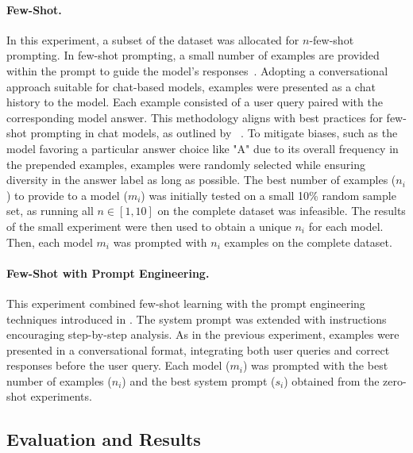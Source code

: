 \paragraph{Few-Shot.}
\label{few-shot-prompt}
In this experiment, a subset of the dataset was allocated for $n$-few-shot prompting. In few-shot prompting, a small number of examples are provided within the prompt to guide the model's responses~\cite{brownLanguageModelsAre2020}. Adopting a conversational approach suitable for chat-based models, examples were presented as a chat history to the model. Each example consisted of a user query paired with the corresponding model answer. This methodology aligns with best practices for few-shot prompting in chat models, as outlined by ~\cite{HowUseFew}. To mitigate biases, such as the model favoring a particular answer choice like "A" due to its overall frequency in the prepended examples, examples were randomly selected while ensuring diversity in the answer label as long as possible. The best number of examples ($n_i$) to provide to a model ($m_i$) was initially tested on a small 10\% random sample set, as running all $n \in [1, 10]$ on the complete dataset was infeasible. The results of the small experiment were then used to obtain a unique $n_i$ for each model. Then, each model $m_i$ was prompted with $n_i$ examples on the complete dataset.

\paragraph{Few-Shot with Prompt Engineering.}
This experiment combined few-shot learning with the prompt engineering techniques introduced in . The system prompt was extended with instructions encouraging step-by-step analysis. As in the previous  experiment, examples were presented in a conversational format, integrating both user queries and correct responses before the user query. Each model ($m_i$) was prompted with the best number of examples ($n_i$) and the best system prompt ($s_i$) obtained from the zero-shot experiments.

\subsection{Evaluation and Results}
